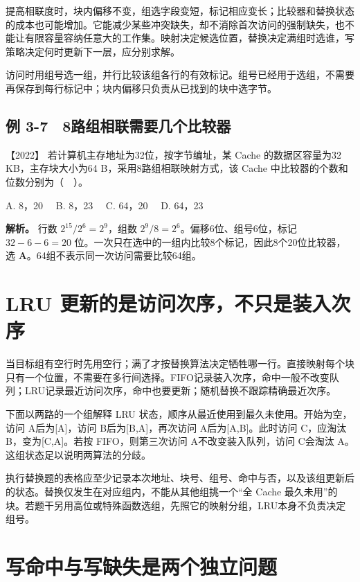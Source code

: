 提高相联度时，块内偏移不变，组选字段变短，标记相应变长；比较器和替换状态的成本也可能增加。它能减少某些冲突缺失，却不消除首次访问的强制缺失，也不能让有限容量容纳任意大的工作集。映射决定候选位置，替换决定满组时选谁，写策略决定何时更新下一层，应分别求解。

访问时用组号选一组，并行比较该组各行的有效标记。组号已经用于选组，不需要再保存到每行标记中；块内偏移只负责从已找到的块中选字节。

\subsection{例 3-7　8路组相联需要几个比较器}\label{co-ex3-7}

\noindent{}【2022】 若计算机主存地址为32位，按字节编址，某 Cache 的数据区容量为32 KB，主存块大小为64 B，采用8路组相联映射方式，该 Cache 中比较器的个数和位数分别为（　）。

A. 8，20　 B. 8，23　 C. 64，20　 D. 64，23


\textbf{解析。} 行数 \(2^{15}/2^6=2^9\)，组数 \(2^9/8=2^6\)。偏移6位、组号6位，标记 \(32-6-6=20\) 位。一次只在选中的一组内比较8个标记，因此8个20位比较器，选 \textbf{A}。64组不表示同一次访问需要比较64组。

\section{LRU 更新的是访问次序，不只是装入次序}\label{co-03-09}

当目标组有空行时先用空行；满了才按替换算法决定牺牲哪一行。直接映射每个块只有一个位置，不需要在多行间选择。FIFO记录装入次序，命中一般不改变队列；LRU记录最近访问次序，命中也要更新；随机替换不跟踪精确最近次序。

下面以两路的一个组解释 LRU 状态，顺序从最近使用到最久未使用。开始为空，访问 A后为{[}A{]}，访问 B后为{[}B,A{]}，再次访问 A后为{[}A,B{]}。此时访问 C，应淘汰 B，变为{[}C,A{]}。若按 FIFO，则第三次访问 A不改变装入队列，访问 C会淘汰 A。这组状态足以说明两算法的分歧。

执行替换题的表格应至少记录本次地址、块号、组号、命中与否，以及该组更新后的状态。替换仅发生在对应组内，不能从其他组挑一个``全 Cache 最久未用''的块。若题干另用高位或特殊函数选组，先照它的映射分组，LRU本身不负责决定组号。

\section{写命中与写缺失是两个独立问题}\label{co-03-10}

